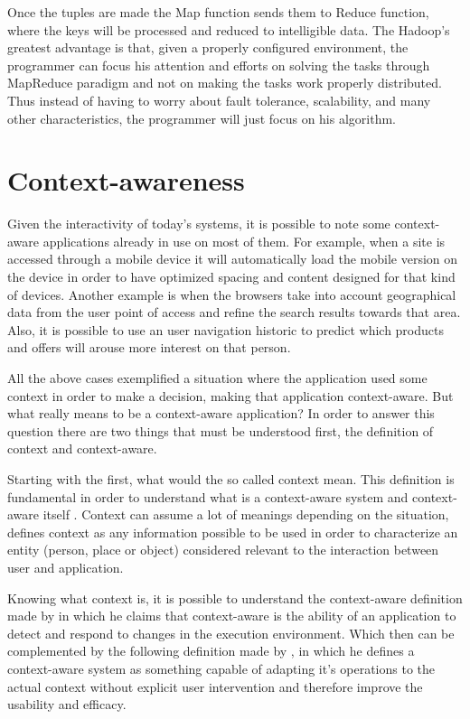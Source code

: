 Once the tuples are made the Map function sends them to Reduce function, where the keys will be processed and reduced to intelligible data. The Hadoop's greatest advantage is that, given a properly configured environment, the programmer can focus his attention and efforts on solving the tasks through MapReduce paradigm and not on making the tasks work properly distributed. Thus instead of having to worry about fault tolerance, scalability, and many other characteristics, the programmer will just focus on his algorithm.


\section{Context-awareness}
\label{sec:ctx}
Given the interactivity of today's systems, it is possible to note some context-aware applications already in use on most of them. For example, when a site is accessed through a mobile device it will automatically load the mobile version on the device in order to have optimized spacing and content designed for that kind of devices. Another example is when the browsers take into account geographical data from the user point of access and refine the search results towards that area. Also, it is possible to use an user navigation historic to predict which products and offers will arouse more interest on that person. 

All the above cases exemplified a situation where the application used some context in order to make a decision, making that application context-aware. But what really means to be a context-aware application? In order to answer this question there are two things that must be understood first, the definition of context and context-aware. 

Starting with the first, what would the so called context mean. This definition is fundamental in order to understand what is a context-aware system and context-aware itself \cite{Manuele}. Context can assume a lot of meanings depending on the situation, \cite{Dey} defines context as any information possible to be used in order to characterize an entity (person, place or object) considered relevant to the interaction between user and application.

Knowing what context is, it is possible to understand the context-aware definition made by \cite{Zakaria} in which he claims that context-aware is the ability of an application to detect and respond to changes in the execution environment. Which then can be complemented by the following definition made by \cite{Baldauf}, in which he defines a context-aware system as something capable of adapting it's operations to the actual context without explicit user intervention and therefore improve the usability and efficacy. 

